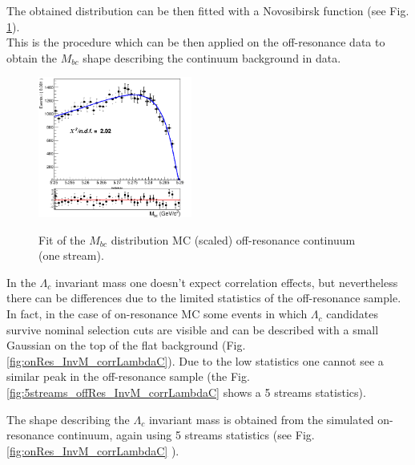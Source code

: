  \noindent  The obtained distribution can be then fitted with a Novosibirsk function (see Fig. \ref{fig:charged_corrLambdaC_Mbc_continuumMC_fit}). \\
This is the procedure which can be then applied on the off-resonance data to obtain the $M_{bc}$ shape describing the continuum background in data.
\begin{figure}[H]
{\includegraphics[width=0.45\textwidth]{04-chargedCorrBtoLambda/figs/stream5_rescaledMbc_40binsHist.png}}
\caption{Fit of the $M_{bc}$ distribution   MC (scaled) off-resonance continuum (one stream).}
\label{fig:charged_corrLambdaC_Mbc_continuumMC_fit}
\end{figure}


In the $\Lambda_c$ invariant mass one doesn't expect correlation effects, but nevertheless there can be differences due to the limited statistics of the off-resonance sample. 
In fact, in the case of on-resonance MC some events in which  $\Lambda_c$ candidates survive nominal selection cuts are visible and can be described with a small Gaussian on the top of the flat background (Fig.\ref{fig:onRes_InvM_corrLambdaC}). Due to the low statistics one cannot see a similar peak in the off-resonance sample (the Fig.\ref{fig:5streams_offRes_InvM_corrLambdaC} shows a 5 streams statistics).

The shape describing the $\Lambda_c$ invariant mass is obtained from the simulated on-resonance continuum, again using 5 streams statistics (see Fig. \ref{fig:onRes_InvM_corrLambdaC} ).


